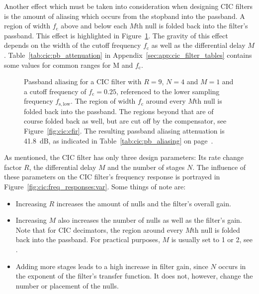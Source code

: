 Another  effect which  must be  taken  into consideration  when designing  CIC
filters is  the amount  of aliasing  which occurs from  the stopband  into the
passband. A region of width $f_\mathrm{c}$ above  and below each $M$th null is
folded  back  into  the  filter's  passband. This  effect  is  highlighted  in
Figure~\ref{fig:cic:freq_responses:passband:aliasing}.   The  gravity of  this
effect  depends  on  the  width  of the  cutoff  frequency  $f_\mathrm{c}$  as
well  as  the  differential delay  $M$. Table~\ref{tab:cic:pb_attenuation}  in
Appendix~\ref{sec:app:cic_filter_tables}  contains  some   values  for  common
ranges for M and $f_\mathrm{c}$.

\begin{figure}
    \centering
        
        \caption[CIC Filter: Passband and Aliasing Attenuation]{%
            Passband  aliasing  for   a  CIC  filter  with  $R   =  9$,  $N=4$
            and  $M=1$  and  a  cutoff frequency  of  $f_\mathrm{c}  =  0.25$,
            referenced  to the  lower  sampling frequency  $f_\mathrm{s,low}$.
            The  region  of  width  $f_\mathrm{c}$  around  every  $M$th  null
            is   folded   back   into   the   passband. The   regions   beyond
            that   are  of   course  folded   back  as   well,  but   are  cut
            off  by  the   compensator,  see  Figure~\ref{fig:cic:cfir}.   The
            resulting   passband  aliasing   attenuation  is   \SI{41.8}{\dB},
            as     indicated     in     Table~\ref{tab:cic:pb_aliasing}     on
            page~\pageref{tab:cic:pb_aliasing}.%
        }
        \label{fig:cic:freq_responses:passband:aliasing}
\end{figure}

As  mentioned, the  CIC filter  has  only three  design parameters: Its  rate
change factor  $R$, the differential delay  $M$ and the number  of stages $N$.
The influence  of these parameters  on the  CIC filter's frequency  response is
portrayed in Figure~\ref{fig:cic:freq_responses:var}. Some things of note are:
\begin{itemize}\tightlist
    \item
        Increasing $R$ increases the amount  of nulls and the filter's overall
        gain.
    \item
        Increasing  $M$ also  increases the  number of  nulls as  well as  the
        filter's gain.  Note that for  CIC decimators, the region around every
        $M$th null is folded back  into the passband.  For practical purposes,
        $M$ is usually set to \num{1} or \num{2}, see \cite{1163535}.
    \item
        Adding more stages leads to a  high increase in filter gain, since $N$
        occurs in the exponent of the filter's transfer function. It does not,
        however, change the number or placement of the nulls.
\end{itemize}

